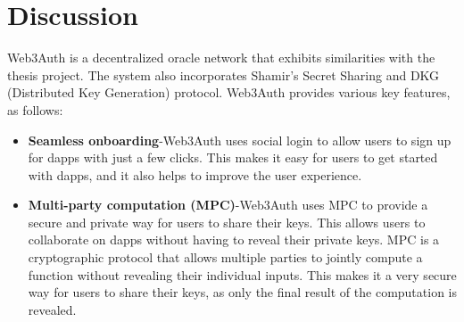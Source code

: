 \documentclass[../Main.tex]{subfiles}
\begin{document}
\section{Discussion}
Web3Auth is a decentralized oracle network that exhibits similarities with the thesis project. The system also incorporates Shamir's Secret Sharing and DKG (Distributed Key Generation) protocol. Web3Auth provides various key features, as follows:
\begin{itemize}
  \item \textbf{Seamless onboarding}-Web3Auth uses social login to allow users to sign up for dapps with just a few clicks. This makes it easy for users to get started with dapps, and it also helps to improve the user experience.
  \item \textbf{Multi-party computation (MPC)}-Web3Auth uses MPC to provide a secure and private way for users to share their keys. This allows users to collaborate on dapps without having to reveal their private keys. MPC is a cryptographic protocol that allows multiple parties to jointly compute a function without revealing their individual inputs. This makes it a very secure way for users to share their keys, as only the final result of the computation is revealed.

\end{itemize}
\end{document}
